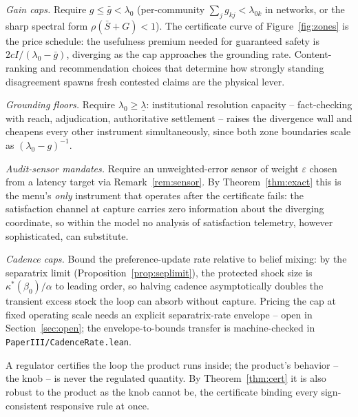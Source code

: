 \documentclass[11pt]{article}
\theoremstyle{definition}
\theoremstyle{remark}
\numberwithin{equation}{section}
\begin{document}
\emph{Gain caps.} Require $g\le\bar g<\lambda_0$ (per-community $\sum_jg_{kj}<\lambda_{0k}$ in networks, or the sharp spectral form $\rho(\bar S+G)<1$). The certificate curve of Figure~\ref{fig:zones} is the price schedule: the usefulness premium needed for guaranteed safety is $2cI/(\lambda_0-\bar g)$, diverging as the cap approaches the grounding rate. Content-ranking and recommendation choices that determine how strongly standing disagreement spawns fresh contested claims are the physical lever.

\emph{Grounding floors.} Require $\lambda_0\ge\underline\lambda$: institutional resolution capacity -- fact-checking with reach, adjudication, authoritative settlement -- raises the divergence wall and cheapens every other instrument simultaneously, since both zone boundaries scale as $(\lambda_0-g)^{-1}$.

\emph{Audit-sensor mandates.} Require an unweighted-error sensor of weight $\varepsilon$ chosen from a latency target via Remark~\ref{rem:sensor}. By Theorem~\ref{thm:exact} this is the menu's \emph{only} instrument that operates after the certificate fails: the satisfaction channel at capture carries zero information about the diverging coordinate, so within the model no analysis of satisfaction telemetry, however sophisticated, can substitute.

\emph{Cadence caps.} Bound the preference-update rate relative to belief mixing: by the separatrix limit (Proposition~\ref{prop:seplimit}), the protected shock size is $\kappa^\ast(\beta_0)/\alpha$ to leading order, so halving cadence asymptotically doubles the transient excess stock the loop can absorb without capture. Pricing the cap at fixed operating scale needs an explicit separatrix-rate envelope -- open in Section~\ref{sec:open}; the envelope-to-bounds transfer is machine-checked in \texttt{PaperIII/CadenceRate.lean}.

A regulator certifies the loop the product runs inside; the product's behavior -- the knob -- is never the regulated quantity. By Theorem~\ref{thm:cert} it is also robust to the product as the knob cannot be, the certificate binding every sign-consistent responsive rule at once.
\end{document}
